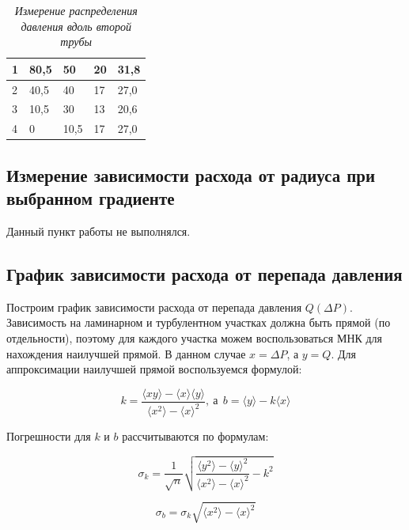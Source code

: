 \documentclass[a4paper,12pt]{article}
\begin{document}
\begin{table}[!ht]
    \centering
    \begin{tabular}{|l|l|l|l|l|}
    \hline
        1 & 80,5 & 50 & 20 & 31,8 \\ \hline
        2 & 40,5 & 40 & 17 & 27,0 \\ \hline
        3 & 10,5 & 30 & 13 & 20,6 \\ \hline
        4 & 0 & 10,5 & 17 & 27,0 \\ \hline
    \end{tabular}\caption{\textit{Измерение распределения давления вдоль второй трубы}}\label{table:p-2}
\end{table}

\clearpage

\subsection{Измерение зависимости расхода от радиуса при выбранном градиенте}\label{p:10}

Данный пункт работы не выполнялся.

\subsection{График зависимости расхода от перепада давления}

Построим график зависимости расхода от перепада давления $Q(\Delta P)$. Зависимость на ламинарном и турбулентном участках должна быть прямой (по отдельности), поэтому для каждого участка можем воспользоваться МНК для нахождения наилучшей прямой. В данном случае $x = \Delta P$, а $y = Q$. Для аппроксимации наилучшей прямой воспользуемся формулой:

\begin{equation}\label{eq:mnk}
    k = \frac{\langle xy\rangle - \langle x \rangle \langle y \rangle}{\langle x^2 \rangle - \langle x \rangle^2},
    \ \text{а} \ \  b = \langle y \rangle - k\langle x \rangle
\end{equation}

Погрешности для $k$ и $b$ рассчитываются по формулам:

\begin{equation}
    \sigma_k = \frac{1}{\sqrt{n}} \sqrt{\frac{\langle y^2 \rangle - \langle y \rangle^2}{\langle x^2 \rangle - \langle x \rangle^2} - k^2}
\end{equation}

\begin{equation}
    \sigma_b = \sigma_k\sqrt{\langle x^2 \rangle - \langle x \rangle^2}
\end{equation}
\end{document}
